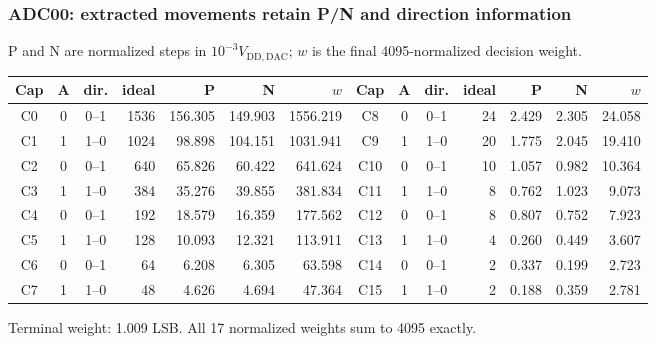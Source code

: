 \begin{frame}
  \frametitle{ADC00: extracted movements retain P/N and direction information}
  \centering
  \scriptsize
  P and N are normalized steps in $10^{-3}V_{\mathrm{DD,DAC}}$; $w$ is the
  final 4095-normalized decision weight.

  \vspace{0.45em}
  \setlength{\tabcolsep}{2.6pt}
  \renewcommand{\arraystretch}{0.82}
  \begin{tabular}{c c c r r r r@{\qquad}c c c r r r r}
    \hline
    Cap & A & dir. & ideal & P & N & $w$ & Cap & A & dir. & ideal & P & N & $w$ \\
    \hline
    C0 & 0 & 0--1 & 1536 & 156.305 & 149.903 & 1556.219 & C8 & 0 & 0--1 & 24 & 2.429 & 2.305 & 24.058 \\
    C1 & 1 & 1--0 & 1024 & 98.898 & 104.151 & 1031.941 & C9 & 1 & 1--0 & 20 & 1.775 & 2.045 & 19.410 \\
    C2 & 0 & 0--1 & 640 & 65.826 & 60.422 & 641.624 & C10 & 0 & 0--1 & 10 & 1.057 & 0.982 & 10.364 \\
    C3 & 1 & 1--0 & 384 & 35.276 & 39.855 & 381.834 & C11 & 1 & 1--0 & 8 & 0.762 & 1.023 & 9.073 \\
    C4 & 0 & 0--1 & 192 & 18.579 & 16.359 & 177.562 & C12 & 0 & 0--1 & 8 & 0.807 & 0.752 & 7.923 \\
    C5 & 1 & 1--0 & 128 & 10.093 & 12.321 & 113.911 & C13 & 1 & 1--0 & 4 & 0.260 & 0.449 & 3.607 \\
    C6 & 0 & 0--1 & 64 & 6.208 & 6.305 & 63.598 & C14 & 0 & 0--1 & 2 & 0.337 & 0.199 & 2.723 \\
    C7 & 1 & 1--0 & 48 & 4.626 & 4.694 & 47.364 & C15 & 1 & 1--0 & 2 & 0.188 & 0.359 & 2.781 \\
    \hline
  \end{tabular}

  \vspace{0.65em}
  \footnotesize Terminal weight: 1.009 LSB. All 17 normalized weights sum to 4095 exactly.
\end{frame}

